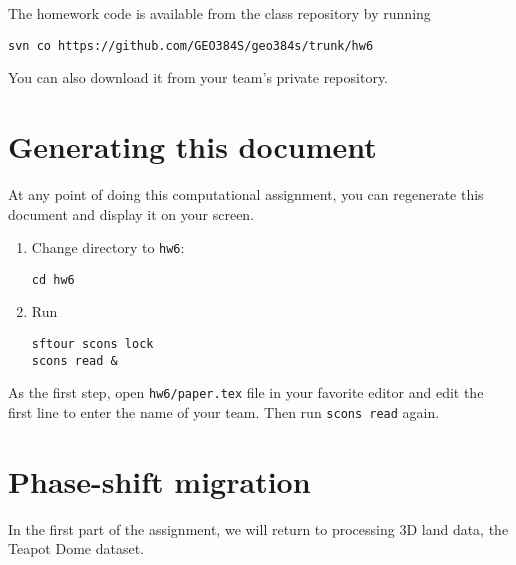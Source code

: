 The homework code is available from the class repository
by running
\begin{verbatim}
svn co https://github.com/GEO384S/geo384s/trunk/hw6
\end{verbatim}
You can also download it from your team's private repository.

\section{Generating this document}

At any point of doing this computational assignment, you can
regenerate this document and display it on your screen.

\begin{enumerate}          
\item Change directory to \texttt{hw6}:
\begin{verbatim}
cd hw6
\end{verbatim}
\item Run
\begin{verbatim}
sftour scons lock
scons read &
\end{verbatim}
\end{enumerate}

As the first step, open \texttt{hw6/paper.tex} file in your favorite
editor and edit the first line to enter the name of your team. Then
run \texttt{scons read} again.

\section{Phase-shift migration}

In the first part of the assignment, we will return to processing 3D land data, the Teapot Dome dataset.


